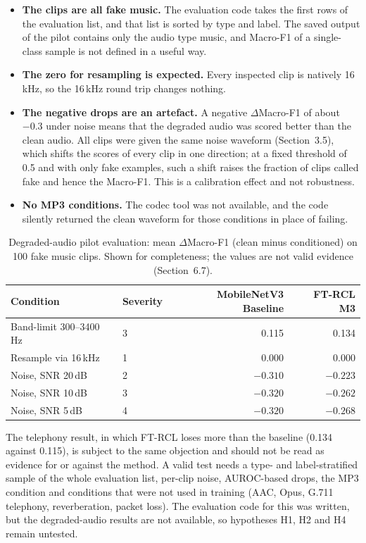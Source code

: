 \documentclass[12pt,a4paper]{report}
\begin{document}
\begin{itemize}
  \item \textbf{The clips are all fake music.} The evaluation code takes the first rows of the evaluation list, and that list is sorted by type and label. The saved output of the pilot contains only the audio type music, and Macro-F1 of a single-class sample is not defined in a useful way.
  \item \textbf{The zero for resampling is expected.} Every inspected clip is natively 16\,kHz, so the 16\,kHz round trip changes nothing.
  \item \textbf{The negative drops are an artefact.} A negative $\Delta$Macro-F1 of about $-0.3$ under noise means that the degraded audio was scored better than the clean audio. All clips were given the same noise waveform (Section~3.5), which shifts the scores of every clip in one direction; at a fixed threshold of 0.5 and with only fake examples, such a shift raises the fraction of clips called fake and hence the Macro-F1. This is a calibration effect and not robustness.
  \item \textbf{No MP3 conditions.} The codec tool was not available, and the code silently returned the clean waveform for those conditions in place of failing.
\end{itemize}

\begin{table}[htbp]
\centering
\caption{Degraded-audio pilot evaluation: mean $\Delta$Macro-F1 (clean minus conditioned) on 100 fake music clips. Shown for completeness; the values are not valid evidence (Section~6.7).}
\label{tab:delta-m-summary}
\small
\begin{tabular}{@{}llrr@{}}
\toprule
Condition & Severity & MobileNetV3 Baseline & FT-RCL M3 \\
\midrule
Band-limit 300--3400\,Hz & 3 & 0.115 & 0.134 \\
Resample via 16\,kHz & 1 & 0.000 & 0.000 \\
Noise, SNR 20\,dB & 2 & $-0.310$ & $-0.223$ \\
Noise, SNR 10\,dB & 3 & $-0.320$ & $-0.262$ \\
Noise, SNR 5\,dB & 4 & $-0.320$ & $-0.268$ \\
\bottomrule
\end{tabular}
\end{table}


The telephony result, in which FT-RCL loses more than the baseline (0.134 against 0.115), is subject to the same objection and should not be read as evidence for or against the method. A valid test needs a type- and label-stratified sample of the whole evaluation list, per-clip noise, AUROC-based drops, the MP3 condition and conditions that were not used in training (AAC, Opus, G.711 telephony, reverberation, packet loss). The evaluation code for this was written, but the degraded-audio results are not available, so hypotheses H1, H2 and H4 remain untested.
\end{document}
